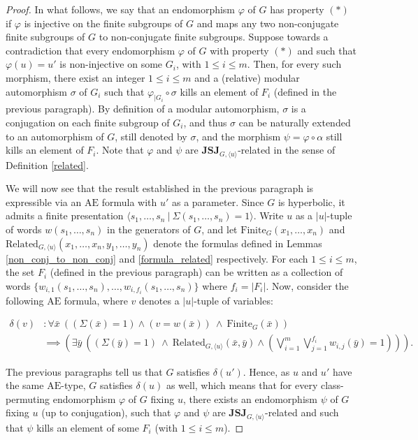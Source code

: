 \documentclass[a4paper, 11pt]{amsart}
\theoremstyle{definition}
\theoremstyle{remark}
\renewcommand{\leq}{\leqslant}
\begin{document}
\begin{proof}
\smallskip \noindent
In what follows, we say that an endomorphism $\varphi$ of $G$ has property $(\ast)$ if $\varphi$ is injective on the finite subgroups of $G$ and maps any two non-conjugate finite subgroups of $G$ to non-conjugate finite subgroups. Suppose towards a contradiction that every endomorphism $\varphi$ of $G$ with property $(\ast)$ and such that $\varphi(u)=u'$ is non-injective on some $G_i$, with $1\leq i\leq m$. Then, for every such morphism, there exist an integer $1\leq i\leq m$ and a (relative) modular automorphism $\sigma$ of $G_i$ such that $\varphi_{\vert G_i}\circ \sigma$ kills an element of $F_i$ (defined in the previous paragraph). By definition of a modular automorphism, $\sigma$ is a conjugation on each finite subgroup of $G_i$, and thus $\sigma$ can be naturally extended to an automorphism of $G$, still denoted by $\sigma$, and the morphism $\psi=\varphi\circ\alpha$ still kills an element of $F_i$. Note that $\varphi$ and $\psi$ are $\mathbf{JSJ}_{G,\langle u\rangle}$-related in the sense of Definition \ref{related}.

\smallskip \noindent
We will now see that the result established in the previous paragraph is expressible via an $\mathrm{AE}$ formula with $u'$ as a parameter. Since $G$ is hyperbolic, it admits a finite presentation $\langle s_1,\ldots,s_n \ \vert \ \Sigma(s_1,\ldots,s_n)=1\rangle$. Write $u$ as a $\vert u\vert$-tuple of words $w(s_1,\ldots,s_n)$ in the generators of $G$, and let $\mathrm{Finite}_G(x_1,\ldots,x_n)$ and $\mathrm{Related}_{G,\langle u\rangle}(x_1,\ldots,x_n,y_1,\ldots,y_n)$ denote the formulas defined in Lemmas \ref{non_conj_to_non_conj} and \ref{formula_related} respectively. For each $1\leq i\leq m$, the set $F_i$ (defined in the previous paragraph) can be written as a collection of words $\lbrace w_{i,1}(s_1,\ldots,s_n),\ldots,w_{i,f_i}(s_1,\ldots,s_n)\rbrace$ where $f_i=\vert F_i\vert$. Now, consider the following $\mathrm{AE}$ formula, where $v$ denotes a $\vert u\vert$-tuple of variables: 

\begin{align*} 
\delta(v) & : \forall\bar{x} \ ((\Sigma(\bar{x})=1) \wedge (v=w(\bar{x})) \ \wedge \ \mathrm{Finite}_G(\bar{x})) \\ 
 & \implies \left(\exists \bar{y} \ \left((\Sigma(\bar{y})=1) \ \wedge \ \mathrm{Related}_{G,\langle u\rangle}(\bar{x},\bar{y}) \wedge \left(\bigvee_{i=1}^m\bigvee_{j=1}^{f_i} w_{i,j}(\bar{y})=1\right)\right)\right).
\end{align*}

\noindent The previous paragraphs tell us that $G$ satisfies $\delta(u')$. Hence, as $u$ and $u'$ have the same $\mathrm{AE}$-type, $G$ satisfies $\delta(u)$ as well, which means that for every class-permuting endomorphism $\varphi$ of $G$ fixing $u$, there exists an endomorphism $\psi$ of $G$ fixing $u$ (up to conjugation), such that $\varphi$ and $\psi$ are $\mathbf{JSJ}_{G,\langle u\rangle}$-related and such that $\psi$ kills an element of some $F_i$ (with $1\leq i\leq m$).


\end{proof}
\end{document}
